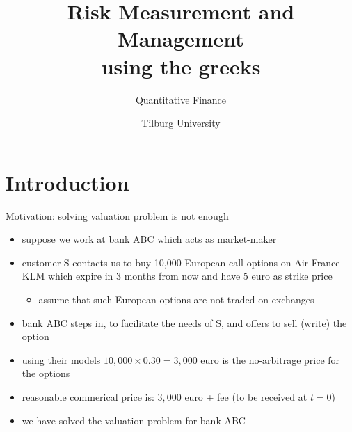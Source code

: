 \documentclass[pdf, handout]{beamer}
\title{Risk Measurement and Management \\
using the greeks}
\subtitle{Quantitative Finance}
\author{Tilburg University}
\institute{Ramon van den Akker}
\date{}
\begin{document}
\begin{frame}
\titlepage
\end{frame}
%


\section{Introduction}
%
\begin{frame}{Motivation: solving valuation problem is not enough}
\begin{itemize}
\item suppose we work at bank ABC which acts
as market-maker 
\item customer S contacts us to buy 10,000 European call options
on Air France-KLM which expire in 3 months from now and have 
5 euro as strike price
\begin{itemize}
\item assume that such European options are not traded on exchanges
\end{itemize}
\item bank ABC steps in, to facilitate the needs of S, and offers to sell (write) the option
\item using their models $10,000\times 0.30 = 3,000$ euro is the no-arbitrage price for the options
\item reasonable commerical price is: $3,000$ euro + fee 
(to be received at $t=0$)
\item we have solved the valuation problem for bank ABC
\end{itemize}
\end{frame}
\end{document}
